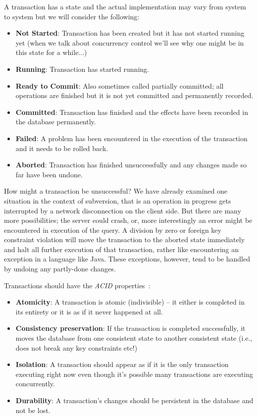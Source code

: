 \documentclass[a4paper]{report}
\begin{document}
A transaction has a state and the actual implementation may vary from system to system but we will consider the following:
\begin{itemize}
\item \textbf{Not Started}: Transaction has been created but it has not started running yet (when we talk about concurrency control we'll see why one might be in this state for a while...)
\item \textbf{Running}: Transaction has started running.
\item \textbf{Ready to Commit}: Also sometimes called partially committed; all operations are finished but it is not yet committed and permanently recorded.
\item \textbf{Committed}: Transaction has finished and the effects have been recorded in the database permanently.
\item \textbf{Failed}: A problem has been encountered in the execution of the transaction and it needs to be rolled back.
\item \textbf{Aborted}: Transaction has finished unsuccessfully and any changes made so far have been undone. 
\end{itemize}

How might a transaction be unsuccessful? We have already examined one situation in the context of subversion, that is an operation in progress gets interrupted by a network disconnection on the client side. But there are many more possibilities; the server could crash, or, more interestingly an error might be encountered in execution of the query. A division by zero or foreign key constraint violation will move the transaction to the aborted state immediately and halt all further execution of that transaction, rather like encountering an exception in a language like Java. These exceptions, however, tend to be handled by undoing any partly-done changes.

Transactions should have the \textit{ACID} properties~\cite{fds}:
\begin{itemize}
	\item \textbf{Atomicity}: A transaction is atomic (indivisible) -- it either is completed in its entirety or it is as if it never happened at all.
	\item \textbf{Consistency preservation}: If the transaction is completed successfully, it moves the database from one consistent state to another consistent state (i.e., does not break any key constraints etc!)
	\item \textbf{Isolation}: A transaction should appear as if it is the only transaction executing right now even though it's possible many transactions are executing concurrently.
	\item \textbf{Durability}: A transaction's changes should be persistent in the database and not be lost. 
\end{itemize}
\end{document}
